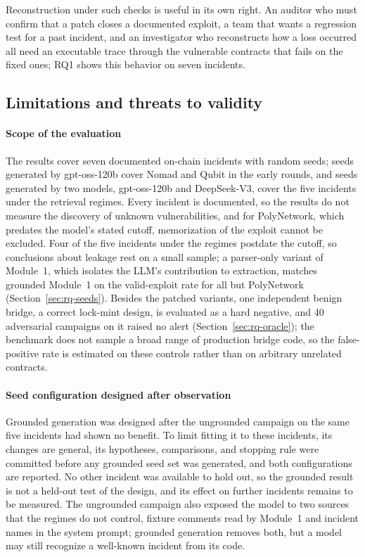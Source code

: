 \documentclass[a4paper]{cas-sc}
\begin{document}
Reconstruction under such checks is useful in its own right. An auditor who must confirm that a patch closes a documented exploit, a team that wants a regression test for a past incident, and an investigator who reconstructs how a loss occurred all need an executable trace through the vulnerable contracts that fails on the fixed ones; RQ1 shows this behavior on seven incidents.

\subsection{Limitations and threats to validity}

\paragraph{Scope of the evaluation}
The results cover seven documented on-chain incidents with random seeds; seeds generated by gpt-oss-120b cover Nomad and Qubit in the early rounds, and seeds generated by two models, gpt-oss-120b and DeepSeek-V3, cover the five incidents under the retrieval regimes. Every incident is documented, so the results do not measure the discovery of unknown vulnerabilities, and for PolyNetwork, which predates the model's stated cutoff, memorization of the exploit cannot be excluded. Four of the five incidents under the regimes postdate the cutoff, so conclusions about leakage rest on a small sample; a parser-only variant of Module~1, which isolates the LLM's contribution to extraction, matches grounded Module~1 on the valid-exploit rate for all but PolyNetwork (Section~\ref{sec:rq-seeds}). Besides the patched variants, one independent benign bridge, a correct lock-mint design, is evaluated as a hard negative, and 40 adversarial campaigns on it raised no alert (Section~\ref{sec:rq-oracle}); the benchmark does not sample a broad range of production bridge code, so the false-positive rate is estimated on these controls rather than on arbitrary unrelated contracts.

\paragraph{Seed configuration designed after observation}
Grounded generation was designed after the ungrounded campaign on the same five incidents had shown no benefit. To limit fitting it to these incidents, its changes are general, its hypotheses, comparisons, and stopping rule were committed before any grounded seed set was generated, and both configurations are reported. No other incident was available to hold out, so the grounded result is not a held-out test of the design, and its effect on further incidents remains to be measured. The ungrounded campaign also exposed the model to two sources that the regimes do not control, fixture comments read by Module~1 and incident names in the system prompt; grounded generation removes both, but a model may still recognize a well-known incident from its code.
\end{document}
